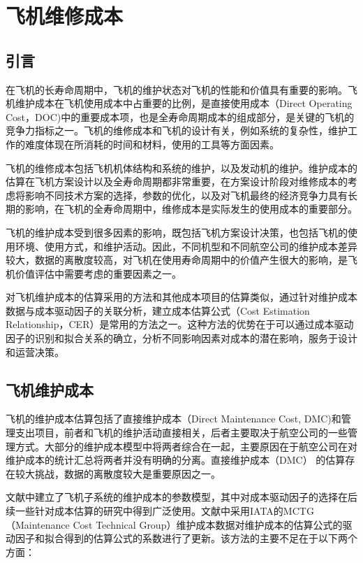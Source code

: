 
\chapter{飞机维修成本}\label{ch2}

\section*{引言}


在飞机的长寿命周期中，飞机的维护状态对飞机的性能和价值具有重要的影响。飞机维护成本在飞机使用成本中占重要的比例，是直接使用成本（Direct Operating  Cost，DOC)中的重要成本项，也是全寿命周期成本的组成部分，是关键的飞机的竞争力指标之一。飞机的维修成本和飞机的设计有关，例如系统的复杂性，维护工作的难度体现在所消耗的时间和材料，使用的工具等方面因素。

飞机的维修成本包括飞机机体结构和系统的维护，以及发动机的维护。维护成本的估算在飞机方案设计以及全寿命周期都非常重要，在方案设计阶段对维修成本的考虑将影响不同技术方案的选择，参数的优化，以及对飞机最终的经济竞争力具有长期的影响，在飞机的全寿命周期中，维修成本是实际发生的使用成本的重要部分。

飞机的维护成本受到很多因素的影响，既包括飞机方案设计决策，也包括飞机的使用环境、使用方式，和维护活动。因此，不同机型和不同航空公司的维护成本差异较大，数据的离散度较高，对飞机在使用寿命周期中的价值产生很大的影响，是飞机价值评估中需要考虑的重要因素之一。

对飞机维护成本的估算采用的方法和其他成本项目的估算类似，通过针对维护成本数据与成本驱动因子的关联分析，建立成本估算公式（Cost Estimation Relationship，CER）是常用的方法之一。这种方法的优势在于可以通过成本驱动因子的识别和拟合关系的确立，分析不同影响因素对成本的潜在影响，服务于设计和运营决策。

\section{飞机维护成本}

飞机的维护成本估算包括了直接维护成本（Direct Maintenance Cost, DMC)和管理支出项目，前者和飞机的维护活动直接相关，后者主要取决于航空公司的一些管理方式。大部分的维护成本模型中将两者综合在一起，主要原因在于航空公司在对维护成本的统计汇总将两者并没有明确的分离。直接维护成本（DMC） 的估算存在较大挑战，数据的离散度较大是重要原因之一。

文献\cite{pearlman1966maintenance}中建立了飞机子系统的维护成本的参数模型，其中对成本驱动因子的选择在后续一些针对成本估算的研究中得到广泛使用。文献\cite{fioriti2018cost}中采用IATA的MCTG（Maintenance Cost Technical Group）\cite{mctg}维护成本数据对维护成本的估算公式的驱动因子和拟合得到的估算公式的系数进行了更新。该方法的主要不足在于以下两个方面：

